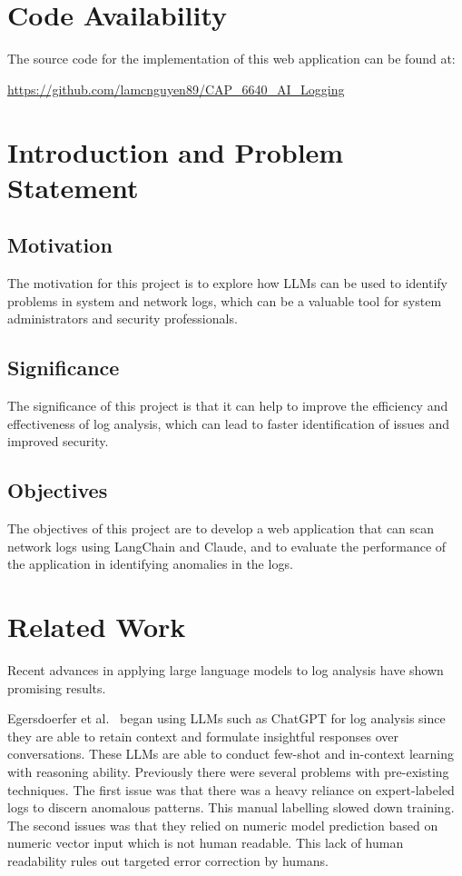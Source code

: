 \documentclass[sigconf]{acmart}
\begin{document}
\section{Code Availability}
The source code for the implementation of this web application can be found at:

\url{https://github.com/lamcnguyen89/CAP_6640_AI_Logging}

\section{Introduction and Problem Statement}


\subsection{Motivation} 

The motivation for this project is to explore how LLMs can be used to identify problems in system and network logs, which can be a valuable tool for system administrators and security professionals. 

\subsection{Significance}

The significance of this project is that it can help to improve the efficiency and effectiveness of log analysis, which can lead to faster identification of issues and improved security. 

\subsection{Objectives}

The objectives of this project are to develop a web application that can scan network logs using LangChain and Claude, and to evaluate the performance of the application in identifying anomalies in the logs.


\section{Related Work}

Recent advances in applying large language models to log analysis have shown promising results. 

Egersdoerfer et al.~\cite{10.1145/3588195.3595943} began using LLMs such as ChatGPT for log analysis since they are able to retain context and formulate insightful responses over conversations. These LLMs are able to conduct few-shot and in-context learning with reasoning ability.
Previously there were several problems with pre-existing techniques. The first issue was that there was a heavy reliance on expert-labeled logs to discern anomalous patterns. This manual labelling slowed down training. The second issues was that they relied on numeric model prediction based on numeric vector input which is not human readable. This lack of human readability rules out targeted error correction by humans. 
\end{document}

